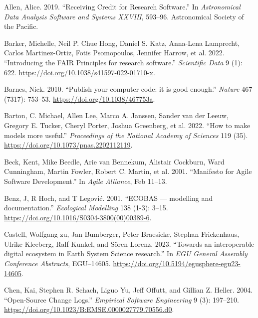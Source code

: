 \documentclass[preprint,11pt,5p]{elsarticle}
\newlength{\cslhangindent}
\newenvironment{CSLReferences}[2] %
{\begin{list}{}{%
	\setlength{\itemindent}{0pt}
	\setlength{\leftmargin}{0pt}
	\setlength{\parsep}{0pt}
	\ifodd #1
	\setlength{\leftmargin}{\cslhangindent}
	\setlength{\itemindent}{-1\cslhangindent}
	\fi
	\setlength{\itemsep}{#2\baselineskip}}}
{\end{list}}
\begin{document}
\label{refs}
\begin{CSLReferences}{1}{0}
Allen, Alice. 2019. {``{Receiving Credit for Research Software}.''} In
\emph{Astronomical Data Analysis Software and Systems XXVIII}, 593--96.
Astronomical Society of the Pacific.

Barker, Michelle, Neil P. Chue Hong, Daniel S. Katz, Anna-Lena
Lamprecht, Carlos Martinez-Ortiz, Fotis Psomopoulos, Jennifer Harrow, et
al. 2022. {``{Introducing the FAIR Principles for research software}.''}
\emph{Scientific Data} 9 (1): 622.
\url{https://doi.org/10.1038/s41597-022-01710-x}.

Barnes, Nick. 2010. {``{Publish your computer code: it is good
enough}.''} \emph{Nature} 467 (7317): 753--53.
\url{https://doi.org/10.1038/467753a}.

Barton, C. Michael, Allen Lee, Marco A. Janssen, Sander van der Leeuw,
Gregory E. Tucker, Cheryl Porter, Joshua Greenberg, et al. 2022. {``{How
to make models more useful}.''} \emph{Proceedings of the National
Academy of Sciences} 119 (35).
\url{https://doi.org/10.1073/pnas.2202112119}.

Beck, Kent, Mike Beedle, Arie van Bennekum, Alistair Cockburn, Ward
Cunningham, Martin Fowler, Robert C. Martin, et al. 2001. {``{Manifesto
for Agile Software Development}.''} In \emph{Agile Alliance}, Feb
11--13.

Benz, J, R Hoch, and T Legović. 2001. {``{ECOBAS --- modelling and
documentation}.''} \emph{Ecological Modelling} 138 (1-3): 3--15.
\url{https://doi.org/10.1016/S0304-3800(00)00389-6}.

Castell, Wolfgang zu, Jan Bumberger, Peter Braesicke, Stephan
Frickenhaus, Ulrike Kleeberg, Ralf Kunkel, and Sören Lorenz. 2023.
{``{Towards an interoperable digital ecosystem in Earth System Science
research}.''} In \emph{EGU General Assembly Conference Abstracts},
EGU--14605. \url{https://doi.org/10.5194/egusphere-egu23-14605}.

Chen, Kai, Stephen R. Schach, Liguo Yu, Jeff Offutt, and Gillian Z.
Heller. 2004. {``{Open-Source Change Logs}.''} \emph{Empirical Software
Engineering} 9 (3): 197--210.
\url{https://doi.org/10.1023/B:EMSE.0000027779.70556.d0}.


\end{CSLReferences}
\end{document}
